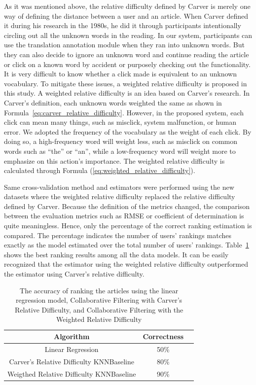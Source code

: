 As it was mentioned above, the relative difficulty defined by Carver is merely one way of defining the distance between a user and an article. When Carver defined it during his research in the 1980s, he did it through participants intentionally circling out all the unknown words in the reading. In our system, participants can use the translation annotation module when they ran into unknown words. But they can also decide to ignore an unknown word and continue reading the article or click on a known word by accident or purposely checking out the functionality. It is very difficult to know whether a click made is equivalent to an unknown vocabulary. To mitigate these issues, a weighted relative difficulty is proposed in this study. A weighted relative difficulty is an idea based on Carver's research. In Carver's definition, each unknown words weighted the same as shown in Formula~\ref{eq:carver_relative_difficulty}. However, in the proposed system, each click can mean many things, such as misclick, system malfunction, or human error. We adopted the frequency of the vocabulary as the weight of each click. By doing so, a high-frequency word will weight less, such as misclick on common words such as “the” or “an”, while a low-frequency word will weight more to emphasize on this action's importance. The weighted relative difficulty is calculated through Formula (\ref{eq:weighted_relative_difficulty}). 

Same cross-validation method and estimators were performed using the new datasets where the weighted relative difficulty replaced the relative difficulty defined by Carver. Because the definition of the metrics changed, the comparison between the evaluation metrics such as RMSE or coefficient of determination is quite meaningless. Hence, only the percentage of the correct ranking estimation is compared. The percentage indicates the number of users' rankings matches exactly as the model estimated over the total number of users' rankings. Table~\ref{table:accuracy_ranking_linear_vs_cf} shows the best ranking results among all the data models. It can be easily recognized that the estimator using the weighted relative difficulty outperformed the estimator using Carver's relative difficulty.

\begin{table}[btp]
 \caption{\label{table:accuracy_ranking_linear_vs_cf} The accuracy of ranking the articles using the linear regression model, Collaborative Filtering with Carver's Relative Difficulty, and Collaborative Filtering with the Weighted Relative Difficulty}
 \begin{center}
  \begin{tabular}{ccc}
   \hline
   Algorithm & Correctness \\
   \hline
   Linear Regression & 50\% \\
   Carver's Relative Difficulty KNNBaseline & 80\% \\
   Weigthed Relative Difficulty KNNBaseline & 90\% \\
   \hline
  \end{tabular} 
 \end{center}
\end{table}
